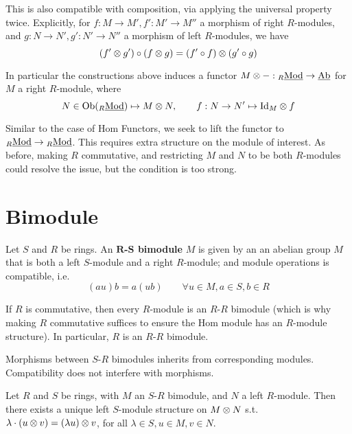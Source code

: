 \documentclass{article}
\begin{document}
\begin{remark}
    This is also compatible with composition, via applying the universal property twice. Explicitly, for $f: M \to M', f': M' \to M''$ a morphism of right $R$-modules, and $g: N \to N', g': N' \to N''$ a morphism of left $R$-modules, we have
    \[
        (f' \otimes g') \circ (f \otimes g) = (f' \circ f) \otimes (g' \circ g)
    \]
\end{remark}

\begin{remark}
    In particular the constructions above induces a functor $M \otimes -: {}_{R}\underline{\textup{Mod}} \to \underline{\textup{Ab}}$ for $M$ a right $R$-module, where 
    \[
        N \in \mathrm{Ob}({}_{R}\underline{\textup{Mod}}) \mapsto M \otimes N, \qquad f: N \to N' \mapsto \mathrm{Id}_{M} \otimes f
    \]
\end{remark}

Similar to the case of Hom Functors, we seek to lift the functor to ${}_{R}\underline{\textup{Mod}} \to {}_{R}\underline{\textup{Mod}}$. This requires extra structure on the module of interest. As before, making $R$ commutative, and restricting $M$ and $N$ to be both $R$-modules could resolve the issue, but the condition is too strong.  

\section{Bimodule}

\begin{definition}[Bimodule]
    Let $S$ and $R$ be rings. An \textbf{$\mathbf{R}$-$\mathbf{S}$ bimodule} $M$ is given by an an abelian group $M$ that is both a left $S$-module and a right $R$-module; and module operations is compatible, i.e.
    \[
        (au)b = a(ub) \qquad \forall u \in M, a \in S, b \in R
    \]
\end{definition}

\begin{remark}
    If $R$ is commutative, then every $R$-module is an $R$-$R$ bimodule (which is why making $R$ commutative suffices to ensure the Hom module has an $R$-module structure). In particular, $R$ is an $R$-$R$ bimodule.
\end{remark}

\begin{remark}
    Morphisms between $S$-$R$ bimodules inherits from corresponding modules. Compatibility does not interfere with morphisms.
\end{remark}

\begin{proposition}\label{Prop:Comp of bimodule}
    Let $R$ and $S$ be rings, with $M$ an $S$-$R$ bimodule, and $N$ a left $R$-module. Then there exists a unique left $S$-module structure on $M \otimes N$ s.t. $\lambda\cdot (u \otimes v) = (\lambda u) \otimes v$, for all $\lambda \in S, u\in M, v\in N$.
\end{proposition}
\end{document}
